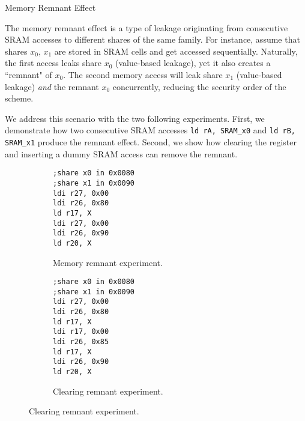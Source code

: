 \begin{subsection}{Memory Remnant Effect} \label{mem_remnant}

The memory remnant effect is a type of leakage originating from consecutive SRAM accesses to different shares of the same family. For instance, assume that shares $x_0$, $x_1$ are stored in SRAM cells and get accessed sequentially. Naturally, the first access leaks share $x_0$ (value-based leakage), yet it also creates a ``remnant" of $x_0$. The second memory access will leak share $x_1$ (value-based leakage) \emph{and} the remnant $x_0$ concurrently, reducing the security order of the scheme.

We address this scenario with the two following experiments. First, we demonstrate how two consecutive SRAM accesses \texttt{ld rA, SRAM\_x0} and \texttt{ld rB, SRAM\_x1} produce the remnant effect. Second, we show how clearing the register and inserting a dummy SRAM access can remove the remnant.    
\begin{figure}[H]
    \centering
\begin{subfigure}[b]{0.4\textwidth}
      \texttt{;share x0 in 0x0080 \\
;share x1 in 0x0090 \\
ldi r27, 0x00\\
ldi r26, 0x80\\
ld r17, X\\
ldi r27, 0x00\\
ldi r26, 0x90\\
ld r20, X
			}

        \caption{\scriptsize{Memory remnant experiment.}}

    \end{subfigure}
\begin{subfigure}[b]{0.4\textwidth}
          \texttt{;share x0 in 0x0080 \\
;share x1 in 0x0090 \\
ldi r27, 0x00\\
ldi r26, 0x80\\
ld r17, X\\
ldi r17, 0x00\\ 
ldi r26, 0x85\\
ld r17, X\\
ldi r26, 0x90\\
ld r20, X
			}
        \caption{\scriptsize{Clearing remnant experiment.}}

    \end{subfigure}



\end{figure}
\end{subsection}
